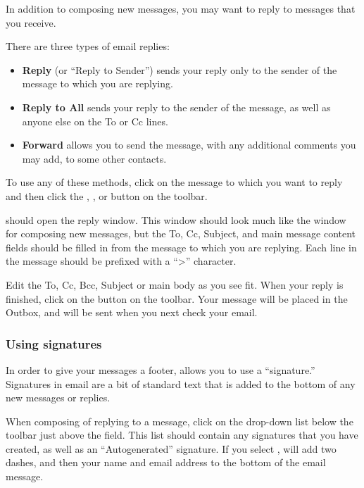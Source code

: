 In addition to composing new messages, you may want to reply to messages that
you receive.

There are three types of email replies:

\begin{itemize}
  \item \textbf{Reply} (or ``Reply to Sender'') \dash sends your reply only to 
the sender of the message to which you are replying.
  \item \textbf{Reply to All} \dash sends your reply to the sender of the 
message, as well as anyone else on the To or Cc lines.
  \item \textbf{Forward} \dash allows you to send the message, with any 
additional comments you may add, to some other contacts.
\end{itemize}

To use any of these methods, click on the message to which you want to reply
and then click the , , or 
button on the toolbar. 

 should open the reply window. This window should look much like 
the window for composing new messages, but the To, Cc, Subject, and main 
message content fields should be filled in from the message to which you 
are replying. Each line in the message should be prefixed with a ``>'' 
character.

Edit the To, Cc, Bcc, Subject or main body as you see fit. When your reply 
is finished, click on the  button on the toolbar. Your message 
will be placed in the Outbox, and will be sent when you next check your email.

\subsubsection{Using signatures}

In order to give your messages a footer,  allows you to use a
``signature.'' Signatures in email are a bit of standard text that is 
added to the bottom of any new messages or replies.

When composing of replying to a message, click on the 
drop-down list below the toolbar just above the  field. 
This list should contain any signatures that you have created, as well as an
``Autogenerated'' signature. If you select , 
will add two dashes, and then your name and email address to the bottom of
the email message.


